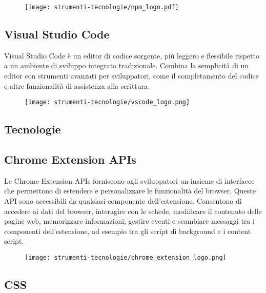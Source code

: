 \begin{figure}[H]
    \centering 
    \texttt{[image: strumenti-tecnologie/npm\_logo.pdf]} 
\end{figure}

\subsection*{Visual Studio Code}

\par Visual Studio Code è un editor di codice sorgente, più leggero e flessibile rispetto a un ambiente di sviluppo integrato tradizionale. Combina la semplicità di un editor con strumenti avanzati per sviluppatori, come il completamento del codice e altre funzionalità di assistenza alla scrittura.

\begin{figure}[H]
    \centering 
    \texttt{[image: strumenti-tecnologie/vscode\_logo.png]} 
\end{figure}

\subsection{Tecnologie}

\subsection*{Chrome Extension APIs}

\par Le Chrome Extension APIs forniscono agli sviluppatori un insieme di interfacce che permettono di estendere e personalizzare le funzionalità del browser. Queste API sono accessibili da qualsiasi componente dell’estensione. Consentono di accedere ai dati del browser, interagire con le schede, modificare il contenuto delle pagine web, memorizzare informazioni, gestire eventi e scambiare messaggi tra i componenti dell’estensione, ad esempio tra gli script di background e i content script.

\begin{figure}[H]
    \centering 
    \texttt{[image: strumenti-tecnologie/chrome\_extension\_logo.png]} 
\end{figure}

\subsection*{CSS}

